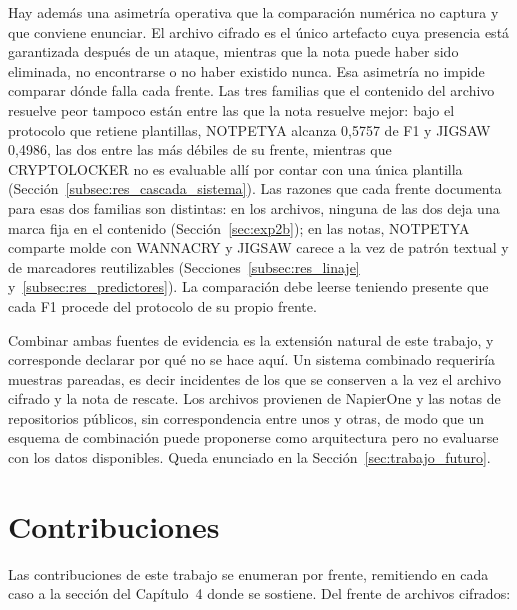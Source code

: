 Hay además una asimetría operativa que la comparación numérica no captura y que conviene enunciar. El archivo cifrado es el único artefacto cuya presencia está garantizada después de un ataque, mientras que la nota puede haber sido eliminada, no encontrarse o no haber existido nunca. Esa asimetría no impide comparar dónde falla cada frente. Las tres familias que el contenido del archivo resuelve peor tampoco están entre las que la nota resuelve mejor: bajo el protocolo que retiene plantillas, NOTPETYA alcanza 0,5757 de F1 y JIGSAW 0,4986, las dos entre las más débiles de su frente, mientras que CRYPTOLOCKER no es evaluable allí por contar con una única plantilla (Sección~\ref{subsec:res_cascada_sistema}). Las razones que cada frente documenta para esas dos familias son distintas: en los archivos, ninguna de las dos deja una marca fija en el contenido (Sección~\ref{sec:exp2b}); en las notas, NOTPETYA comparte molde con WANNACRY y JIGSAW carece a la vez de patrón textual y de marcadores reutilizables (Secciones~\ref{subsec:res_linaje} y~\ref{subsec:res_predictores}). La comparación debe leerse teniendo presente que cada F1 procede del protocolo de su propio frente.

Combinar ambas fuentes de evidencia es la extensión natural de este trabajo, y corresponde declarar por qué no se hace aquí. Un sistema combinado requeriría muestras pareadas, es decir incidentes de los que se conserven a la vez el archivo cifrado y la nota de rescate. Los archivos provienen de NapierOne y las notas de repositorios públicos, sin correspondencia entre unos y otras, de modo que un esquema de combinación puede proponerse como arquitectura pero no evaluarse con los datos disponibles. Queda enunciado en la Sección~\ref{sec:trabajo_futuro}.

\section{Contribuciones}
\label{sec:contribuciones}

Las contribuciones de este trabajo se enumeran por frente, remitiendo en cada caso a la sección del Capítulo~4 donde se sostiene. Del frente de archivos cifrados:

